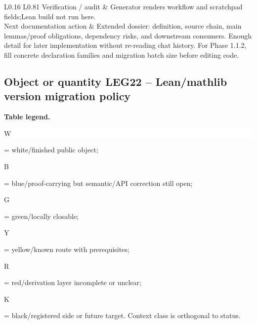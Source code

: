 \begin{longtable}{L{0.16\linewidth} L{0.81\linewidth}}
\hline\addlinespace[0.20em]
Verification /\allowbreak{} audit & Generator renders workflow and scratchpad fields;\newline Lean build not run here.\\
\hline\addlinespace[0.20em]
Next documentation action & Extended dossier: definition, source chain, main lemmas/\allowbreak{}proof obligations, dependency risks, and downstream consumers. Enough detail for later implementation without re-reading chat history. For Phase 1.1.2, fill concrete declaration families and migration batch size before editing code.\\
\hline\addlinespace[0.20em]
\end{longtable}
\subsection*{Object or quantity LEG22 -- Lean/\allowbreak{}mathlib version migration policy}
\hypertarget{objproof:LEG22}{}
\par\smallskip\noindent\begin{minipage}{0.99\linewidth}\footnotesize\raggedright\textbf{Table legend.} \colorbox{white}{\strut W} = white/finished public object; \colorbox{cyan!20}{\strut B} = blue/proof-carrying but semantic/API correction still open; \colorbox{green!18}{\strut G} = green/locally closable; \colorbox{yellow!25}{\strut Y} = yellow/known route with prerequisites; \colorbox{red!20}{\strut R} = red/derivation layer incomplete or unclear; \colorbox{black!18}{\strut K} = black/registered side or future target. Context class is orthogonal to status.\end{minipage}\par\vspace{0.25em}
